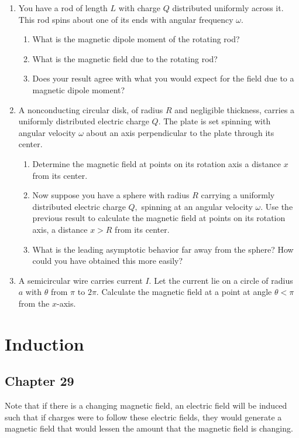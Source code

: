 \documentclass[12pt]{book}
\begin{document}
\begin{enumerate}
  \item You have a rod of length $L$ with charge $Q$ distributed uniformly across it. This rod spins about one of its ends with angular frequency $\omega.$
  \begin{enumerate}
  \item What is the magnetic dipole moment of the rotating rod?
  \item What is the magnetic field due to the rotating rod?
  \item Does your result agree with what you would expect for the field due to a magnetic dipole moment?
  \end{enumerate}
  \item A nonconducting circular disk, of radius $R$ and negligible thickness, carries a uniformly distributed electric charge $Q$. The plate is set spinning with angular velocity $\omega$ about an axis perpendicular to the plate through its center.
  \begin{enumerate}
  \item Determine the magnetic field at points on its rotation axis a distance $x$ from its center.
  \item Now suppose you have a sphere with radius $R$ carrying a uniformly distributed electric charge $Q,$ spinning at an angular velocity $\omega.$ Use the previous result to calculate the magnetic field at points on its rotation axis, a distance $x>R$ from its center.
  \item What is the leading asymptotic behavior far away from the sphere? How could you have obtained this more easily?
  \end{enumerate}
  \item  A semicircular wire carries current $I$. Let the current lie on a circle of radius $a$ with $\theta$ from $\pi$ to $2\pi.$ Calculate the magnetic field at a point at angle $\theta < \pi$ from the $x$-axis.
\end{enumerate}
 
\chapter{Induction}

\section{Chapter 29}

Note that if there is a changing magnetic field, an electric field will be induced such that if charges were to follow these electric fields, they would generate a magnetic field that would lessen the amount that the magnetic field is changing.
\end{document}

